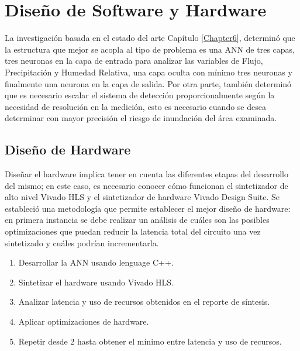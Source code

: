 
\chapter{Diseño de Software y Hardware} %
\label{Chapter10}

La investigación basada en el estado del arte Capítulo \ref{Chapter6}, determinó que la estructura que mejor se acopla al tipo de problema es una ANN de tres capas, tres neuronas en la capa de entrada para analizar las variables de Flujo, Precipitación y Humedad Relativa, una capa oculta con mínimo tres neuronas y finalmente una neurona en la capa de salida. Por otra parte, también determinó que es necesario escalar el sistema de detección proporcionalmente según la necesidad de resolución en la medición, esto es necesario cuando se desea determinar con mayor precisión el riesgo de inundación del área examinada.



\section{Diseño de Hardware}

Diseñar el hardware implica tener en cuenta las diferentes etapas del desarrollo del mismo; en este caso, es necesario conocer cómo funcionan el sintetizador de alto nivel Vivado HLS y el sintetizador de hardware Vivado Design Suite. Se estableció una metodología que permite establecer el mejor diseño de hardware: en primera instancia se debe realizar un análisis de cuáles son las posibles optimizaciones que puedan reducir la latencia total del circuito una vez sintetizado y cuáles podrían incrementarla.

\begin{enumerate}
\item Desarrollar la ANN usando lenguage C++.
\item Sintetizar el hardware usando Vivado HLS.
\item Analizar latencia y uso de recursos obtenidos en el reporte de síntesis.
\item Aplicar optimizaciones de hardware.
\item Repetir desde 2 hasta obtener el mínimo entre latencia y uso de recursos.
\end{enumerate}

